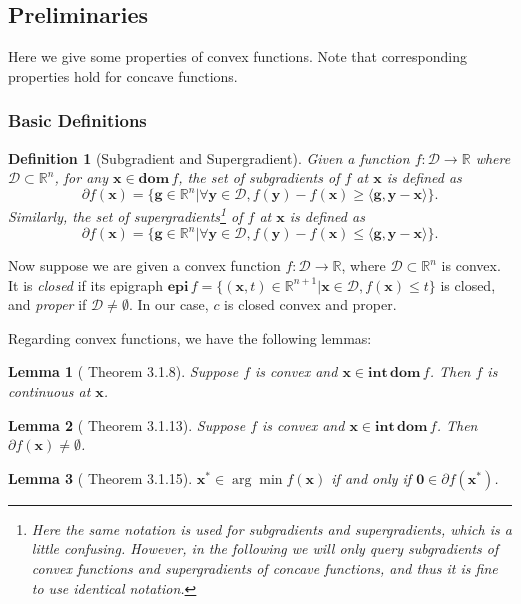 \documentclass{article}
\newtheorem{definition}{Definition}[section]
\newtheorem{lemma}{Lemma}[section]
\begin{document}
\subsection{Preliminaries}
Here we give some properties of convex functions. Note that corresponding properties hold for concave functions.
\subsubsection{Basic Definitions}
\begin{definition}[Subgradient and Supergradient]\label{subgrad}
    Given a function $f:\mathcal{D}\to \mathbb{R}$ where $\mathcal{D}\subset \mathbb{R}^n$, for any $\mathbf{x}\in \mathbf{dom}\,f$, the set of subgradients of $f$ at $\mathbf{x}$ is defined as
    \begin{equation}
        \partial f(\mathbf{x})=\{\mathbf{g}\in \mathbb{R}^n|\forall \mathbf{y}\in \mathcal{D},f(\mathbf{y})-f(\mathbf{x})\ge \langle \mathbf{g},\mathbf{y}-\mathbf{x}\rangle\}.
    \end{equation}
    Similarly, the set of supergradients\footnote{Here the same notation is used for subgradients and supergradients, which is a little confusing. However, in the following we will only query subgradients of convex functions and supergradients of concave functions, and thus it is fine to use identical notation.} of $f$ at $\mathbf{x}$ is defined as
    \begin{equation}
        \partial f(\mathbf{x})=\{\mathbf{g}\in \mathbb{R}^n|\forall \mathbf{y}\in \mathcal{D},f(\mathbf{y})-f(\mathbf{x})\le \langle \mathbf{g},\mathbf{y}-\mathbf{x}\rangle\}.
    \end{equation}
\end{definition}

Now suppose we are given a convex function $f:\mathcal{D}\to \mathbb{R}$, where $\mathcal{D}\subset \mathbb{R}^n$ is convex. It is \emph{closed} if its epigraph $\mathbf{epi}\,f=\{(\mathbf{x},t)\in \mathbb{R}^{n+1}|\mathbf{x}\in \mathcal{D},f(\mathbf{x})\le t\}$ is closed, and \emph{proper} if $\mathcal{D}\ne\emptyset$. In our case, $c$ is closed convex and proper.

Regarding convex functions, we have the following lemmas:
\begin{lemma}[\cite{N13} Theorem 3.1.8]\label{continuity}
    Suppose $f$ is convex and $\mathbf{x}\in \mathbf{int}\,\mathbf{dom}\,f$. Then $f$ is continuous at $\mathbf{x}$.
\end{lemma}
\begin{lemma}[\cite{N13} Theorem 3.1.13]\label{subgradExist}
    Suppose $f$ is convex and $\mathbf{x}\in \mathbf{int}\,\mathbf{dom}\,f$. Then $\partial f(\mathbf{x})\ne\emptyset$.
\end{lemma}
\begin{lemma}[\cite{N13} Theorem 3.1.15]\label{subgradOpt}
    $\mathbf{x}^*\in\arg\min f(\mathbf{x})$ if and only if $\mathbf{0}\in\partial f(\mathbf{x}^*)$.
\end{lemma}
\end{document}
